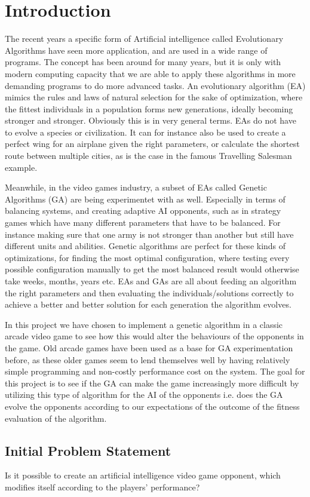 \section{Introduction} \label{sec:introduction}
The recent years a specific form of Artificial intelligence called Evolutionary Algorithms have seen more application, and are used in a wide range of programs. The concept has been around for many years, but it is only with modern computing capacity that we are able to apply these algorithms in more demanding programs to do more advanced tasks. An evolutionary algorithm (EA) mimics the rules and laws of natural selection for the sake of optimization, where the fittest individuals in a population forms new generations, ideally becoming stronger and stronger. Obviously this is in very general terms. EAs do not have to evolve a species or civilization. It can for instance also be used to create a perfect wing for an airplane given the right parameters, or calculate the shortest route between multiple cities, as is the case in the famous Travelling Salesman example. 

Meanwhile, in the video games industry, a subset of EAs called Genetic Algorithms (GA) are being experimentet with as well. Especially in terms of balancing systems, and creating adaptive AI opponents, such as in strategy games which have many different parameters that have to be balanced. For instance making sure that one army is not stronger than another but still have different units and abilities. Genetic algorithms are perfect for these kinds of optimizations, for finding the most optimal configuration, where testing every possible configuration manually to get the most balanced result would otherwise take weeks, months, years etc. EAs and GAs are all about feeding an algorithm the right parameters and then evaluating the individuals/solutions correctly to achieve a better and better solution for each generation the algorithm evolves. 

In this project we have chosen to implement a genetic algorithm in a classic arcade video game to see how this would alter the behaviours of the opponents in the game. Old arcade games have been used as a base for GA experimentation before, as these older games seem to lend themselves well by having relatively simple programming and non-costly performance cost on the system. The goal for this project is to see if the GA can make the game increasingly more difficult by utilizing this type of algorithm for the AI of the opponents i.e. does the GA evolve the opponents according to our expectations of the outcome of the fitness evaluation of the algorithm.



\subsection{Initial Problem Statement} \label{sec:initialproblemstatement}
Is it possible to create an artificial intelligence video game opponent, which modifies itself according to the players' performance?
